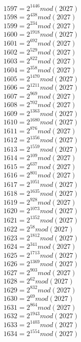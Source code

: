 \documentclass[12pt, letterpaper]{article}
\begin{document}
\begin{itemize}
\begin{multicols}{3}
$1597= 2^{1446} mod (2027)$\\
$1598= 2^{438} mod (2027)$\\
$1599= 2^{234} mod (2027)$\\
$1600= 2^{1918} mod (2027)$\\
$1601= 2^{692} mod (2027)$\\
$1602= 2^{529} mod (2027)$\\
$1603= 2^{822} mod (2027)$\\
$1604= 2^{358} mod (2027)$\\
$1605= 2^{1470} mod (2027)$\\
$1606= 2^{1211} mod (2027)$\\
$1607= 2^{969} mod (2027)$\\
$1608= 2^{702} mod (2027)$\\
$1609= 2^{1363} mod (2027)$\\
$1610= 2^{1680} mod (2027)$\\
$1611= 2^{876} mod (2027)$\\
$1612= 2^{1356} mod (2027)$\\
$1613= 2^{1559} mod (2027)$\\
$1614= 2^{109} mod (2027)$\\
$1615= 2^{637} mod (2027)$\\
$1616= 2^{801} mod (2027)$\\
$1617= 2^{1051} mod (2027)$\\
$1618= 2^{1635} mod (2027)$\\
$1619= 2^{928} mod (2027)$\\
$1620= 2^{1073} mod (2027)$\\
$1621= 2^{1352} mod (2027)$\\
$1622= 2^{58} mod (2027)$\\
$1623= 2^{1812} mod (2027)$\\
$1624= 2^{341} mod (2027)$\\
$1625= 2^{1713} mod (2027)$\\
$1626= 2^{1369} mod (2027)$\\
$1627= 2^{903} mod (2027)$\\
$1628= 2^{62} mod (2027)$\\
$1629= 2^{832} mod (2027)$\\
$1630= 2^{69} mod (2027)$\\
$1631= 2^{864} mod (2027)$\\
$1632= 2^{1943} mod (2027)$\\
$1633= 2^{1403} mod (2027)$\\
$1634= 2^{1554} mod (2027)$\\

\end{multicols}
\end{itemize}
\end{document}
